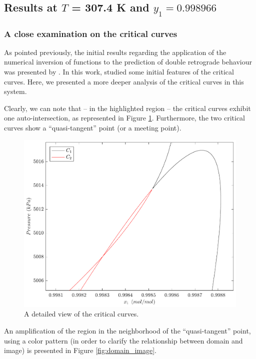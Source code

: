 \documentclass{article}
\theoremstyle{definition}
\theoremstyle{remark}
\begin{document}
\subsection{Results at $T$ = 307.4 K and $y_1 = 0.998966$}

\subsubsection{A close examination on the critical curves}

As pointed previously, the initial results regarding the application of the numerical inversion of functions to the prediction of double retrograde behaviour was presented by \cite{ireme}. In this work, \cite{ireme} studied some initial features of the critical curves. Here, we presented a more deeper analysis of the critical curves in this system.

Clearly, we can note that -- in the highlighted region -- the critical curves exhibit one auto-intersection, as represented in Figure \ref{fig:sinais}. Furthermore, the two critical curves show a ``quasi-tangent'' point (or a meeting point).

\begin{figure}
	\begin{center}
		\includegraphics[scale=0.50]{curvas_criticas_dominio_new.pdf}
		\caption{A detailed view of the critical curves.}\label{fig:sinais}
	\end{center}
\end{figure}
 
An amplification of the region in the neighborhood of the ``quasi-tangent'' point, using a color pattern (in order to clarify the relationship between domain and image) is presented in Figure \ref{fig:domain_image}.
\end{document}
